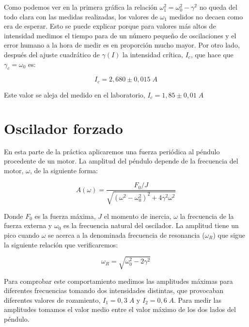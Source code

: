 \documentclass[a4paper,12pt,titlepage]{article}
\begin{document}
Como podemos ver en la primera gráfica la relación $\omega_1^2=\omega_0^2-\gamma^2$ no queda del todo clara con las medidas realizadas, los valores de $\omega_1$ medidos no decaen como era de esperar. Esto se puede explicar porque para valores más altos de intensidad medimos el tiempo para de un número pequeño de oscilaciones y el error humano a la hora de medir es en proporción mucho mayor. Por otro lado, después del ajuste cuadrático de $\gamma(I)$ la intensidad crítica, $I_c$, que hace que $\gamma_c=\omega_0$ es:

\begin{equation}
    I_c=2,680 \pm 0,015 \; A
\end{equation}

Este valor se aleja del medido en el laboratorio, $I_c=1,85\pm 0,01 \;A$

\newpage

\section{Oscilador forzado}

En esta parte de la práctica aplicaremos una fuerza periódica al péndulo procedente de un motor. La amplitud del péndulo depende de la frecuencia del motor, $\omega$, de la siguiente forma:

\begin{equation}
    A(\omega) = \frac{F_0/J}{\sqrt{(\omega^2-\omega_0^2)^2+4\gamma^2\omega^2}}
    \label{aw}
\end{equation}

Donde $F_0$ es la fuerza máxima, $J$ el momento de inercia, $\omega$ la frecuencia de la fuerza externa y $\omega_0$ es la frecuencia natural del oscilador. La amplitud tiene un pico cuando $\omega$ se acerca a la denominada frecuencia de resonancia ($\omega_R$) que sigue la siguiente relación que verificaremos:

\begin{equation}
    \omega_R = \sqrt{\omega_0^2-2\gamma^2}
    \label{omegaR}
\end{equation}

Para comprobar este comportamiento medimos las amplitudes máximas para diferentes frecuencias tomando dos intensidades distintas, que provocaban diferentes valores de rozamiento, $I_1=0,3 \;A$ y $I_2=0,6\; A$. Para medir las amplitudes tomamos el valor medio entre el valor máximo de los dos lados del péndulo.
\end{document}
